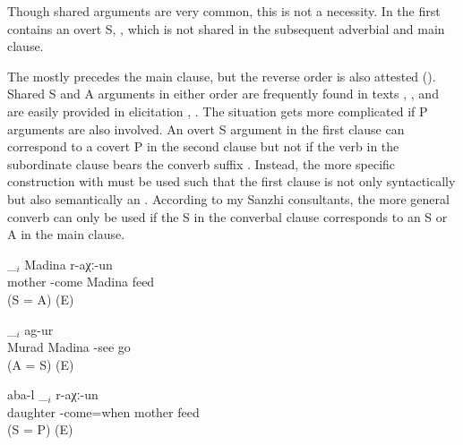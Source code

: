 Though shared arguments are very common, this is not a necessity. In  the first  contains an overt S, , which is not shared in the subsequent adverbial and main clause.

The  mostly precedes the main clause, but the reverse order is also attested (). Shared S and A arguments in either order are frequently found in texts , , and are easily provided in elicitation , . The situation gets more complicated if P arguments are also involved. An overt S argument in the first clause can correspond to a covert P in the second clause but not if the verb in the subordinate clause bears the converb suffix . Instead, the more specific construction with  must be used such that the first clause is not only syntactically but also semantically an  . According to my Sanzhi consultants, the more general converb  can only be used if the S in the converbal clause corresponds to an S or A in the main clause.
%
\begin{exe}
	\ex	\label{ex:Mother, Madina, feeding@39}
	\begin{xlist}
		\ex	\label{ex:Mother came and fed Madina@39a}
		\gll	[aba$_{i}$	sa-r-eʁ-ib-le]	\_$_{i}$	Madina	r-aχː-un\\
			mother	-come		Madina	feed\\
		\glt	{} (S = A) (E)

		\ex	\label{ex:Murad saw Madina and went away@39b}
			\_$_{i}$	ag-ur\\
			Murad	Madina	-see		go\\
		\glt	{} (A = S) (E)

		\ex	\label{ex:When the daughter came, the mother fed@39c}
		\gll	[rursːi$_{i}$	sa-r-eʁ-ib=qːella]	aba-l	\_$_{i}$	r-aχː-un\\
			daughter	-come=when	mother		feed\\
		\glt	{} (S = P) (E)
	\end{xlist}
\end{exe}

